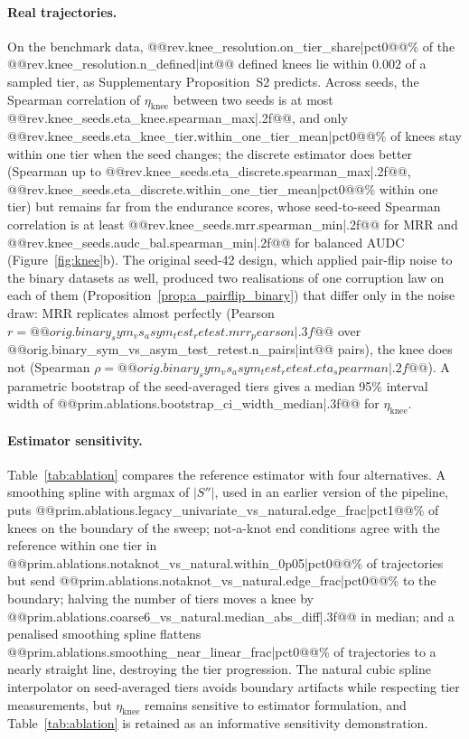 \documentclass[pdflatex,sn-mathphys]{sn-jnl}
\theoremstyle{thmstyleone}
\theoremstyle{thmstyletwo}
\theoremstyle{thmstylethree}
\newcommand{\etaknee}{\eta_{\mathrm{knee}}}
\begin{document}
\paragraph{Real trajectories.} On the benchmark data, @@{rev.knee_resolution.on_tier_share|pct0}@@\% of the @@{rev.knee_resolution.n_defined|int}@@ defined knees lie within $0.002$ of a sampled tier, as Supplementary Proposition~S2 predicts. Across seeds, the Spearman correlation of $\etaknee$ between two seeds is at most @@{rev.knee_seeds.eta_knee.spearman_max|.2f}@@, and only @@{rev.knee_seeds.eta_knee_tier.within_one_tier_mean|pct0}@@\% of knees stay within one tier when the seed changes; the discrete estimator does better (Spearman up to @@{rev.knee_seeds.eta_discrete.spearman_max|.2f}@@, @@{rev.knee_seeds.eta_discrete.within_one_tier_mean|pct0}@@\% within one tier) but remains far from the endurance scores, whose seed-to-seed Spearman correlation is at least @@{rev.knee_seeds.mrr.spearman_min|.2f}@@ for MRR and @@{rev.knee_seeds.audc_bal.spearman_min|.2f}@@ for balanced AUDC (Figure~\ref{fig:knee}b). The original seed-42 design, which applied pair-flip noise to the binary datasets as well, produced two realisations of one corruption law on each of them (Proposition~\ref{prop:a_pairflip_binary}) that differ only in the noise draw: MRR replicates almost perfectly (Pearson $r=@@{orig.binary_sym_vs_asym_test_retest.mrr_pearson|.3f}@@$ over @@{orig.binary_sym_vs_asym_test_retest.n_pairs|int}@@ pairs), the knee does not (Spearman $\rho=@@{orig.binary_sym_vs_asym_test_retest.eta_spearman|.2f}@@$). A parametric bootstrap of the seed-averaged tiers gives a median 95\% interval width of @@{prim.ablations.bootstrap_ci_width_median|.3f}@@ for $\etaknee$.



\paragraph{Estimator sensitivity.} Table~\ref{tab:ablation} compares the reference estimator with four alternatives. A smoothing spline with argmax of $\lvert S''\rvert$, used in an earlier version of the pipeline, puts @@{prim.ablations.legacy_univariate_vs_natural.edge_frac|pct1}@@\% of knees on the boundary of the sweep; not-a-knot end conditions agree with the reference within one tier in @@{prim.ablations.notaknot_vs_natural.within_0p05|pct0}@@\% of trajectories but send @@{prim.ablations.notaknot_vs_natural.edge_frac|pct0}@@\% to the boundary; halving the number of tiers moves a knee by @@{prim.ablations.coarse6_vs_natural.median_abs_diff|.3f}@@ in median; and a penalised smoothing spline flattens @@{prim.ablations.smoothing_near_linear_frac|pct0}@@\% of trajectories to a nearly straight line, destroying the tier progression. The natural cubic spline interpolator on seed-averaged tiers avoids boundary artifacts while respecting tier measurements, but $\etaknee$ remains sensitive to estimator formulation, and Table~\ref{tab:ablation} is retained as an informative sensitivity demonstration.
\end{document}
